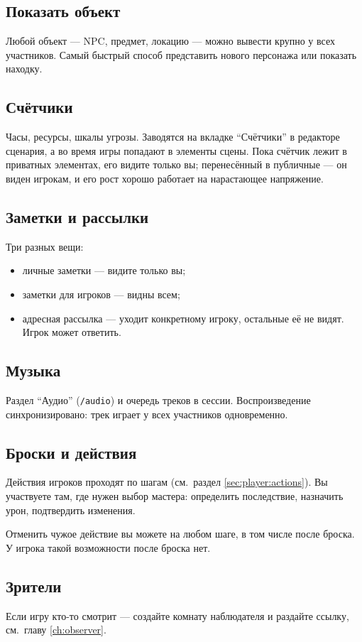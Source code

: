 \subsection{Показать объект}
Любой объект --- NPC, предмет, локацию --- можно вывести крупно у всех участников. Самый быстрый способ представить нового персонажа или показать находку.

\subsection{Счётчики}
Часы, ресурсы, шкалы угрозы. Заводятся на вкладке ``Счётчики'' в редакторе сценария, а во время игры попадают в элементы сцены. Пока счётчик лежит в приватных элементах, его видите только вы; перенесённый в публичные --- он виден игрокам, и его рост хорошо работает на нарастающее напряжение.

\subsection{Заметки и рассылки}
Три разных вещи:

\begin{itemize}
\item личные заметки --- видите только вы;
\item заметки для игроков --- видны всем;
\item адресная рассылка --- уходит конкретному игроку, остальные её не видят. Игрок может ответить.
\end{itemize}

\subsection{Музыка}
Раздел ``Аудио'' (\texttt{/audio}) и очередь треков в сессии. Воспроизведение синхронизировано: трек играет у всех участников одновременно.

\subsection{Броски и действия}
Действия игроков проходят по шагам (см.\ раздел \ref{sec:player:actions}). Вы участвуете там, где нужен выбор мастера: определить последствие, назначить урон, подтвердить изменения.

Отменить чужое действие вы можете на любом шаге, в том числе после броска. У игрока такой возможности после броска нет.

\subsection{Зрители}
Если игру кто-то смотрит --- создайте комнату наблюдателя и раздайте ссылку, см.\ главу \ref{ch:observer}.

